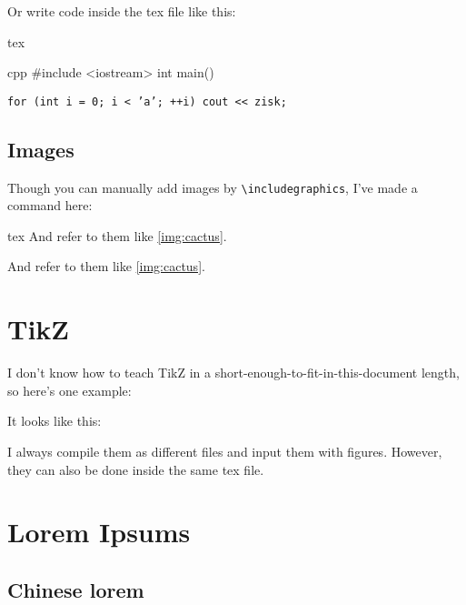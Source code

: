 \documentclass{fhw}
\begin{document}
Or write code inside the tex file like this:
\begin{Code}{tex}

\begin{Code}{cpp}
#include <iostream>
int main() {}
\end{Code}

\texttt{for (int i = 0; i < 'a'; ++i) cout << zisk; }

\subsection{Images}

Though you can manually add images by \verb|\includegraphics|, I've made a command here:
\begin{Code}{tex}
And refer to them like \cref{img:cactus}.
\end{Code}

And refer to them like \cref{img:cactus}.

\section{TikZ}

I don't know how to teach TikZ in a short-enough-to-fit-in-this-document length, so here's one example:


It looks like this:


I always compile them as different files and input them with figures. However, they can also be done inside the same tex file.

\section{Lorem Ipsums}

\subsection {Chinese lorem}


\end{Code}
\end{document}
